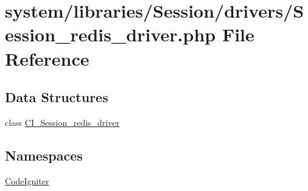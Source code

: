 \hypertarget{_session__redis__driver_8php}{}\section{system/libraries/\+Session/drivers/\+Session\+\_\+redis\+\_\+driver.php File Reference}
\label{_session__redis__driver_8php}
\subsection*{Data Structures}
\begin{DoxyCompactItemize}
\item 
class \mbox{\hyperlink{class_c_i___session__redis__driver}{C\+I\+\_\+\+Session\+\_\+redis\+\_\+driver}}
\end{DoxyCompactItemize}
\subsection*{Namespaces}
\begin{DoxyCompactItemize}
\item 
 \mbox{\hyperlink{namespace_code_igniter}{Code\+Igniter}}
\end{DoxyCompactItemize}
